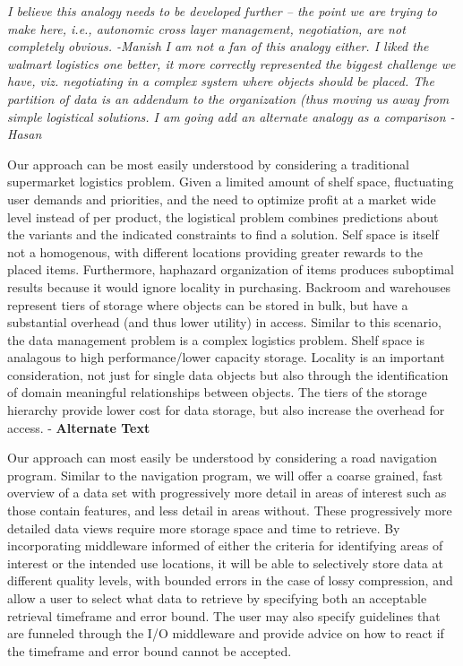 \documentclass[11pt,letterpaper]{article}
\newcommand{\manish}[1]{{\it \color{red} #1 -Manish}}
\newcommand{\hasan}[1]{{\it \color{darkgreen} #1 -Hasan }}
\newcommand{\ALT}[1]{{\color{red} #1 - {\bf Alternate Text}}}
\newcommand{\manish}[1]{}
\newcommand{\hasan}[1]{}
\newcommand{\ALT}[1]{}}
\begin{document}
\manish{I believe this analogy needs to be developed further -- the point we
  are trying to make here, i.e., autonomic cross layer management,
  negotiation, are not completely obvious.}
\hasan{I am not a fan of this analogy either. I liked the walmart logistics
  one better, it more correctly represented the biggest challenge we have,
  viz. negotiating in a complex system where objects should be placed. The
  partition of data is an addendum to the organization (thus moving us away
  from simple logistical solutions. I am going add an alternate analogy as a
  comparison}

\ALT{Our approach can be most easily understood by considering a traditional
  supermarket logistics problem. Given a limited amount of shelf space,
  fluctuating user demands and priorities, and the need to optimize profit at
  a market wide level instead of per product, the logistical problem combines
  predictions about the variants and the indicated constraints to find a
  solution. Self space is itself not a homogenous, with different locations
  providing greater rewards to the placed items. Furthermore, haphazard
  organization of items produces suboptimal results because it would ignore
  locality in purchasing. Backroom and warehouses represent tiers of storage
  where objects can be stored in bulk, but have a substantial overhead (and
  thus lower utility) in access. Similar to this scenario, the data management
  problem is a complex logistics problem. Shelf space is analagous to high
  performance/lower capacity storage. Locality is an important consideration,
  not just for single data objects but also through the identification of
  domain meaningful relationships between objects. The tiers of the storage
  hierarchy provide lower cost for data storage, but also increase the
  overhead for access.}

Our approach can most easily be understood by considering a road navigation
program. Similar to the navigation program, we will offer a coarse grained,
fast overview of a data set with progressively more detail in areas of
interest such as those contain features, and less detail in areas
without. These progressively more detailed data views require more storage
space and time to retrieve. By incorporating middleware informed of either
the criteria for identifying areas of interest or the intended use
locations, it will be able to selectively store data at different quality
levels, with bounded errors in the case of lossy compression, and allow a
user to select what data to retrieve by specifying both an acceptable
retrieval timeframe and error bound.
The user may also specify guidelines that are funneled through the I/O middleware and 
provide advice on how to react if the timeframe and error bound cannot be accepted.
\end{document}
